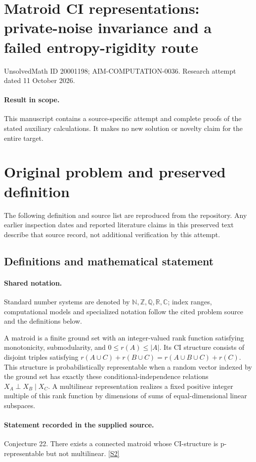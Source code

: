 \documentclass[11pt]{article}
\begin{document}
\section*{Matroid CI representations: private-noise invariance and a failed entropy-rigidity route}
\noindent UnsolvedMath ID 20001198; AIM-COMPUTATION-0036. Research attempt dated 11 October 2026.
\paragraph{Result in scope.}This manuscript contains a source-specific attempt and complete proofs of the stated auxiliary calculations. It makes no new solution or novelty claim for the entire target.
\section{Original problem and preserved definition}
The following definition and source list are reproduced from the repository. Any earlier inspection dates and reported literature claims in this preserved text describe that source record, not additional verification by this attempt.
\subsection{Definitions and mathematical statement}

\paragraph{Shared notation.}Standard number systems are denoted by $\mathbb N,\mathbb Z,\mathbb Q,\mathbb R,\mathbb C$; index ranges, computational models and specialized notation follow the cited problem source and the definitions below.


A matroid is a finite ground set with an integer-valued rank function satisfying monotonicity, submodularity, and $0\le r(A)\le |A|$. Its CI structure consists of disjoint triples satisfying $r(A\cup C)+r(B\cup C)=r(A\cup B\cup C)+r(C)$. This structure is probabilistically representable when a random vector indexed by the ground set has exactly these conditional-independence relations $X_A\perp X_B\mid X_C$. A multilinear representation realizes a fixed positive integer multiple of this rank function by dimensions of sums of equal-dimensional linear subspaces.
\paragraph{Statement recorded in the supplied source.}
Conjecture 22. There exists a connected matroid whose CI-structure is p-representable but not multilinear. \href{https://aimath.org/WWN/compalgstat/compalgstat.pdf}{[S2]}
\end{document}
